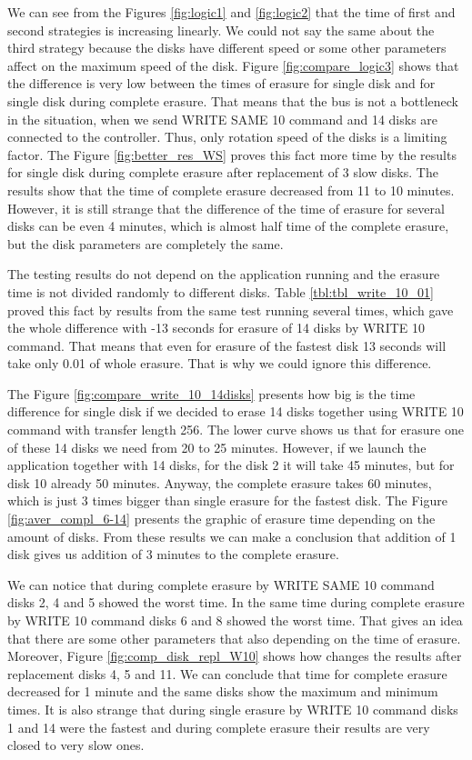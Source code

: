 We can see from the Figures \ref{fig:logic1} and \ref{fig:logic2} that the time of first and second strategies is increasing linearly. We could not say the same about the third strategy because the disks have different speed or some other parameters affect on the maximum speed of the disk. Figure \ref{fig:compare_logic3} shows that the difference is very low between the times of erasure for single disk and for single disk during complete erasure. That means that the bus is not a bottleneck in the situation, when we send WRITE SAME 10 command and 14 disks are connected to the controller. Thus, only rotation speed of the disks is a limiting factor. The Figure \ref{fig:better_res_WS} proves this fact more time by the results for single disk during complete erasure after replacement of 3 slow disks. The results show that the time of complete erasure decreased from 11 to 10 minutes. However, it is still strange that the difference of the time of erasure for several disks can be even 4 minutes, which is almost half time of the complete erasure, but the disk parameters are completely the same.

The testing results do not depend on the application running and the erasure time is not divided randomly to different disks. Table \ref{tbl:tbl_write_10_01} proved this fact by results from the same test running several times, which gave the whole difference with -13 seconds for erasure of 14 disks by WRITE 10 command. That means that even for erasure of the fastest disk 13 seconds will take only 0.01 of whole erasure. That is why we could ignore this difference. 

The Figure \ref{fig:compare_write_10_14disks} presents how big is the time difference for single disk if we decided to erase 14 disks together using WRITE 10 command with transfer length 256. The lower curve shows us that for erasure one of these 14 disks we need from 20 to 25 minutes. However, if we launch the application together with 14 disks, for the disk 2 it will take 45 minutes, but for disk 10 already 50 minutes. Anyway, the complete erasure takes 60 minutes, which is just 3 times bigger than single erasure for the fastest disk. The Figure \ref{fig:aver_compl_6-14} presents the graphic of erasure time depending on the amount of disks. From these results we can make a conclusion that addition of 1 disk gives us addition of 3 minutes to the complete erasure.

We can notice that during complete erasure by WRITE SAME 10 command disks 2, 4 and 5 showed the worst time. In the same time during complete erasure by WRITE 10 command disks 6 and 8 showed the worst time. That gives an idea that there are some other parameters that also depending on the time of erasure. Moreover, Figure \ref{fig:comp_disk_repl_W10} shows how changes the results after replacement disks 4, 5 and 11. We can conclude that time for complete erasure decreased for 1 minute and the same disks show the maximum and minimum times. It is also strange that during single erasure by WRITE 10 command disks 1 and 14 were the fastest and during complete erasure their results are very closed to very slow ones.

